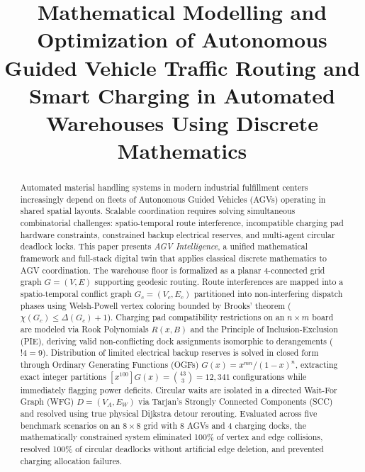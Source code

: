 \documentclass[conference]{IEEEtran}
\begin{document}
\title{Mathematical Modelling and Optimization of Autonomous Guided Vehicle Traffic Routing and Smart Charging in Automated Warehouses Using Discrete Mathematics}

\author{
}

\maketitle

\begin{abstract}
Automated material handling systems in modern industrial fulfillment centers increasingly depend on fleets of Autonomous Guided Vehicles (AGVs) operating in shared spatial layouts. Scalable coordination requires solving simultaneous combinatorial challenges: spatio-temporal route interference, incompatible charging pad hardware constraints, constrained backup electrical reserves, and multi-agent circular deadlock locks. This paper presents \textit{AGV Intelligence}, a unified mathematical framework and full-stack digital twin that applies classical discrete mathematics to AGV coordination. The warehouse floor is formalized as a planar 4-connected grid graph $G=(V, E)$ supporting geodesic routing. Route interferences are mapped into a spatio-temporal conflict graph $G_c=(V_c, E_c)$ partitioned into non-interfering dispatch phases using Welsh-Powell vertex coloring bounded by Brooks' theorem ($\chi(G_c) \le \Delta(G_c) + 1$). Charging pad compatibility restrictions on an $n \times m$ board are modeled via Rook Polynomials $R(x, B)$ and the Principle of Inclusion-Exclusion (PIE), deriving valid non-conflicting dock assignments isomorphic to derangements ($!4 = 9$). Distribution of limited electrical backup reserves is solved in closed form through Ordinary Generating Functions (OGFs) $G(x) = x^{mn}/(1-x)^n$, extracting exact integer partitions $[x^{100}] G(x) = \binom{43}{3} = 12,341$ configurations while immediately flagging power deficits. Circular waits are isolated in a directed Wait-For Graph (WFG) $D=(V_A, E_W)$ via Tarjan's Strongly Connected Components (SCC) and resolved using true physical Dijkstra detour rerouting. Evaluated across five benchmark scenarios on an $8 \times 8$ grid with 8 AGVs and 4 charging docks, the mathematically constrained system eliminated 100\% of vertex and edge collisions, resolved 100\% of circular deadlocks without artificial edge deletion, and prevented charging allocation failures.
\end{abstract}
\end{document}
